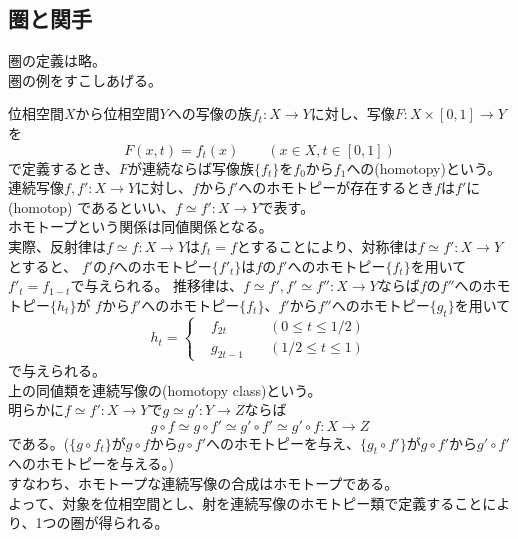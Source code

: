 \documentclass[dvipdfmx,a4paper,11pt]{jsarticle}
\begin{document}
\subsection{圏と関手}

圏の定義は略。\\
圏の例をすこしあげる。
\begin{tcolorbox}[title = 例1]
  位相空間$X$から位相空間$Y$への写像の族$f_{t}:X\to Y$に対し、写像$F:X\times [0,1] \to Y$を
  \begin{equation*}
    F(x,t)=f_{t}(x)\qquad (x\in X,t \in [0,1])
  \end{equation*}
  で定義するとき、$F$が連続ならば写像族$\{f_t\}$を$f_0$から$f_1$への(homotopy)という。\\
  連続写像$f,f':X\to Y$に対し、$f$から$f'$へのホモトピーが存在するとき$f$は$f'$に(homotop)
  であるといい、$f\simeq f':X\to Y$で表す。\\
  ホモトープという関係は同値関係となる。\\
  実際、反射律は$f\simeq f:X\to Y$は$f_{t}=f$とすることにより、対称律は$f\simeq f':X\to Y$とすると、
  $f'$の$f$へのホモトピー$\{f'_{t}\}$は$f$の$f'$へのホモトピー$\{f_{t}\}$を用いて$f'_{t}=f_{1-t}$で与えられる。
  推移律は、$f\simeq f',f'\simeq f'':X\to Y$ならば$f$の$f''$へのホモトピー$\{h_{t}\}$が
  $f$から$f'$へのホモトピー$\{f_{t}\}$、$f'$から$f''$へのホモトピー$\{g_{t}\}$を用いて
  \begin{equation*}
    h_{t}=\left\{ 
    \begin{alignedat}{2}   
      &f_{2t}  \quad &(0\leq t\leq 1/2)\\   
      &g_{2t-1}\quad &(1/2\leq t\leq 1)
    \end{alignedat} 
    \right.
  \end{equation*}
  で与えられる。\\
  上の同値類を連続写像の(homotopy class)という。\\
  明らかに$f\simeq f':X\to Y$で$g\simeq g':Y\to Z$ならば\\
  \begin{equation*}
    g\circ f\simeq g\circ f'\simeq g'\circ f'\simeq g'\circ f:X \to Z
  \end{equation*}
  である。($\{g\circ f_{t}\}$が$g\circ f$から$g\circ f'$へのホモトピーを与え、$\{g_{t}\circ f'\}$が$g\circ f'$から$g'\circ f'$へのホモトピーを与える。)\\
  すなわち、ホモトープな連続写像の合成はホモトープである。\\
  よって、対象を位相空間とし、射を連続写像のホモトピー類で定義することにより、1つの圏が得られる。
\end{tcolorbox}
\end{document}
